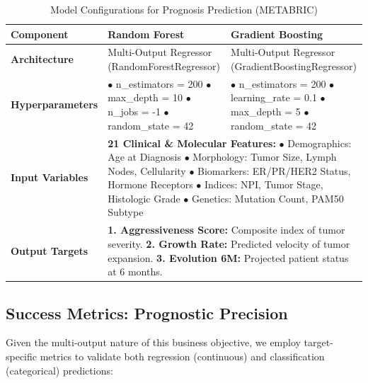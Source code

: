 \begin{table}[H]
\centering
\small
\renewcommand{\arraystretch}{1.5}
\begin{tabular}{|p{}|p{}|p{}|}
\hline
\textbf{Component} & \textbf{Random Forest} & \textbf{Gradient Boosting} \\
\hline
\textbf{Architecture} & Multi-Output Regressor (RandomForestRegressor) & Multi-Output Regressor (GradientBoostingRegressor) \\
\hline
\textbf{Hyperparameters} & 
$\bullet$ n\_estimators = 200 \newline
$\bullet$ max\_depth = 10 \newline
$\bullet$ n\_jobs = -1 \newline
$\bullet$ random\_state = 42 & 
$\bullet$ n\_estimators = 200 \newline
$\bullet$ learning\_rate = 0.1 \newline
$\bullet$ max\_depth = 5 \newline
$\bullet$ random\_state = 42 \\
\hline
\textbf{Input Variables} & \multicolumn{2}{p{0.75\textwidth}|}{\textbf{21 Clinical \& Molecular Features:} \newline
$\bullet$ Demographics: Age at Diagnosis \newline
$\bullet$ Morphology: Tumor Size, Lymph Nodes, Cellularity \newline
$\bullet$ Biomarkers: ER/PR/HER2 Status, Hormone Receptors \newline
$\bullet$ Indices: NPI, Tumor Stage, Histologic Grade \newline
$\bullet$ Genetics: Mutation Count, PAM50 Subtype} \\
\hline
\textbf{Output Targets} & \multicolumn{2}{p{0.75\textwidth}|}{
\textbf{1. Aggressiveness Score:} Composite index of tumor severity. \newline
\textbf{2. Growth Rate:} Predicted velocity of tumor expansion. \newline
\textbf{3. Evolution 6M:} Projected patient status at 6 months.} \\
\hline
\end{tabular}
\caption{Model Configurations for Prognosis Prediction (METABRIC)}
\label{tab:metabric_model_config}
\end{table}

\subsection{Success Metrics: Prognostic Precision}
Given the multi-output nature of this business objective, we employ target-specific metrics to validate both regression (continuous) and classification (categorical) predictions:

